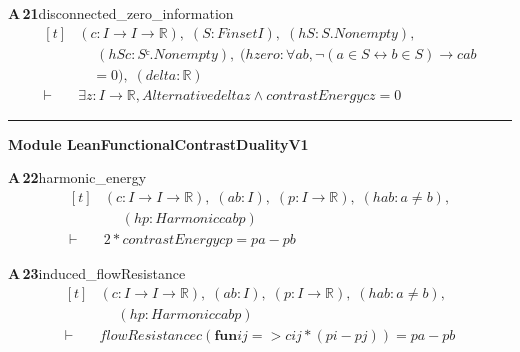 \documentclass[conference]{IEEEtran}
\theoremstyle{definition}
\newcommand{\lean}[1]{\textsf{\footnotesize #1}}
\begin{document}
\noindent\textbf{A\,21}\quad\lean{disconnected\_zero\_information}
{\footnotesize\[ \begin{aligned}[t]
&(\mathit{c} : \mathit{I} \to \mathit{I} \to \mathbb{R} ),\; (\mathit{S} : \mathit{Finset} \mathit{I}),\; (\mathit{hS} : \mathit{S}.\mathit{Nonempty}),\\
&\quad \; (\mathit{hSc} : \mathit{Sᶜ}.\mathit{Nonempty}),\; (\mathit{hzero} : \forall \mathit{a} \mathit{b},\neg (\mathit{a} \in \mathit{S} \leftrightarrow \mathit{b} \in \mathit{S}) \to \mathit{c} \mathit{a} \mathit{b}\\
&\quad =0),\; (\mathit{delta} : \mathbb{R} )\\
\vdash\;&\exists \mathit{z} : \mathit{I} \to \mathbb{R} ,\mathit{Alternative} \mathit{delta} \mathit{z} \wedge \mathit{contrastEnergy} \mathit{c} \mathit{z}=0
\end{aligned} \]}

\vspace{4pt}\noindent\rule{\columnwidth}{0.4pt}\par\vspace{2pt}
\noindent\textbf{Module \lean{LeanFunctionalContrastDualityV1}}\par\vspace{3pt}

\noindent\textbf{A\,22}\quad\lean{harmonic\_energy}
{\footnotesize\[ \begin{aligned}[t]
&(\mathit{c} : \mathit{I} \to \mathit{I} \to \mathbb{R} ),\; (\mathit{a} \mathit{b} : \mathit{I}),\; (\mathit{p} : \mathit{I} \to \mathbb{R} ),\; (\mathit{hab} : \mathit{a} \neq \mathit{b}),\\
&\quad \; (\mathit{hp} : \mathit{Harmonic} \mathit{c} \mathit{a} \mathit{b} \mathit{p})\\
\vdash\;&2*\mathit{contrastEnergy} \mathit{c} \mathit{p} = \mathit{p} \mathit{a}-\mathit{p} \mathit{b}
\end{aligned} \]}

\noindent\textbf{A\,23}\quad\lean{induced\_flowResistance}
{\footnotesize\[ \begin{aligned}[t]
&(\mathit{c} : \mathit{I} \to \mathit{I} \to \mathbb{R} ),\; (\mathit{a} \mathit{b} : \mathit{I}),\; (\mathit{p} : \mathit{I} \to \mathbb{R} ),\; (\mathit{hab} : \mathit{a} \neq \mathit{b}),\\
&\quad \; (\mathit{hp} : \mathit{Harmonic} \mathit{c} \mathit{a} \mathit{b} \mathit{p})\\
\vdash\;&\mathit{flowResistance} \mathit{c} (\mathbf{fun} \mathit{i} \mathit{j} => \mathit{c} \mathit{i} \mathit{j}*(\mathit{p} \mathit{i}-\mathit{p} \mathit{j})) = \mathit{p} \mathit{a}-\mathit{p} \mathit{b}
\end{aligned} \]}
\end{document}

